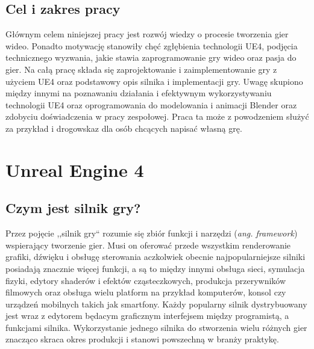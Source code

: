 \documentclass[multip]{SGGW-thesis}
\begin{document}
\section{Cel i zakres pracy}
Głównym celem niniejszej pracy jest rozwój wiedzy o procesie tworzenia gier wideo. Ponadto motywację stanowiły chęć zgłębienia technologii UE4, podjęcia technicznego wyzwania, jakie stawia zaprogramowanie gry wideo oraz pasja do gier. Na całą pracę składa się zaprojektowanie i zaimplementowanie gry z użyciem UE4 oraz podstawowy opis silnika i implementacji gry. 
\newline Uwagę skupiono między innymi na poznawaniu działania i efektywnym wykorzystywaniu technologii UE4 oraz oprogramowania do modelowania i animacji Blender oraz zdobyciu doświadczenia w pracy zespołowej.
\newline Praca ta może z powodzeniem służyć za przykład i drogowskaz dla osób chcących napisać własną grę.

\chapter{Unreal Engine 4}
\section{Czym jest silnik gry?}
Przez pojęcie ,,silnik gry`` rozumie się zbiór funkcji i narzędzi ({\em ang. framework}) wspierający tworzenie gier. Musi on oferować przede wszystkim renderowanie grafiki, dźwięku i obsługę sterowania aczkolwiek obecnie najpopularniejsze silniki posiadają znacznie więcej funkcji, a są to między innymi obsługa sieci, symulacja fizyki, edytory shaderów i efektów cząsteczkowych, produkcja przerywników filmowych oraz obsługa wielu platform na przykład komputerów, konsol czy urządzeń mobilnych takich jak smartfony. Każdy popularny silnik dystrybuowany jest wraz z edytorem będacym graficznym interfejsem między programistą, a funkcjami silnika.
\newline Wykorzystanie jednego silnika do stworzenia wielu różnych gier znacząco skraca okres produkcji i stanowi powszechną w branży praktykę.\cite{learning-unreal}\cite{wiki-game-engine}
\end{document}
